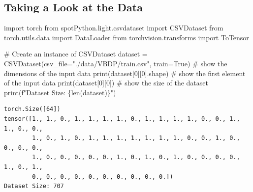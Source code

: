 \documentclass[
  letterpaper,
  DIV=11,
  numbers=noendperiod]{scrreprt}
\newenvironment{Shaded}{\begin{snugshade}}{\end{snugshade}}
\newcommand{\BuiltInTok}[1]{\textcolor[rgb]{0.00,0.23,0.31}{#1}}
\newcommand{\CommentTok}[1]{\textcolor[rgb]{0.37,0.37,0.37}{#1}}
\newcommand{\DecValTok}[1]{\textcolor[rgb]{0.68,0.00,0.00}{#1}}
\newcommand{\ImportTok}[1]{\textcolor[rgb]{0.00,0.46,0.62}{#1}}
\newcommand{\NormalTok}[1]{\textcolor[rgb]{0.00,0.23,0.31}{#1}}
\newcommand{\OperatorTok}[1]{\textcolor[rgb]{0.37,0.37,0.37}{#1}}
\newcommand{\SpecialCharTok}[1]{\textcolor[rgb]{0.37,0.37,0.37}{#1}}
\newcommand{\SpecialStringTok}[1]{\textcolor[rgb]{0.13,0.47,0.30}{#1}}
\newcommand{\StringTok}[1]{\textcolor[rgb]{0.13,0.47,0.30}{#1}}
\newcommand{\VariableTok}[1]{\textcolor[rgb]{0.07,0.07,0.07}{#1}}
\begin{document}
\hypertarget{sec-taking-a-look-at-the-data-31}{%
\subsection{Taking a Look at the
Data}\label{sec-taking-a-look-at-the-data-31}}

\begin{Shaded}
\begin{Highlighting}[]
\ImportTok{import}\NormalTok{ torch}
\ImportTok{from}\NormalTok{ spotPython.light.csvdataset }\ImportTok{import}\NormalTok{ CSVDataset}
\ImportTok{from}\NormalTok{ torch.utils.data }\ImportTok{import}\NormalTok{ DataLoader}
\ImportTok{from}\NormalTok{ torchvision.transforms }\ImportTok{import}\NormalTok{ ToTensor}

\CommentTok{\# Create an instance of CSVDataset}
\NormalTok{dataset }\OperatorTok{=}\NormalTok{ CSVDataset(csv\_file}\OperatorTok{=}\StringTok{"./data/VBDP/train.csv"}\NormalTok{, train}\OperatorTok{=}\VariableTok{True}\NormalTok{)}
\CommentTok{\# show the dimensions of the input data}
\BuiltInTok{print}\NormalTok{(dataset[}\DecValTok{0}\NormalTok{][}\DecValTok{0}\NormalTok{].shape)}
\CommentTok{\# show the first element of the input data}
\BuiltInTok{print}\NormalTok{(dataset[}\DecValTok{0}\NormalTok{][}\DecValTok{0}\NormalTok{])}
\CommentTok{\# show the size of the dataset}
\BuiltInTok{print}\NormalTok{(}\SpecialStringTok{f"Dataset Size: }\SpecialCharTok{\{}\BuiltInTok{len}\NormalTok{(dataset)}\SpecialCharTok{\}}\SpecialStringTok{"}\NormalTok{)}
\end{Highlighting}
\end{Shaded}

\begin{verbatim}
torch.Size([64])
tensor([1., 1., 0., 1., 1., 1., 1., 0., 1., 1., 1., 1., 0., 0., 1., 1., 0., 0.,
        1., 0., 1., 0., 1., 1., 1., 1., 1., 1., 1., 0., 0., 1., 0., 0., 0., 0.,
        1., 0., 0., 0., 0., 0., 1., 0., 1., 0., 1., 0., 0., 0., 0., 1., 0., 1.,
        0., 0., 0., 0., 0., 0., 0., 0., 0., 0.])
Dataset Size: 707
\end{verbatim}
\end{document}
